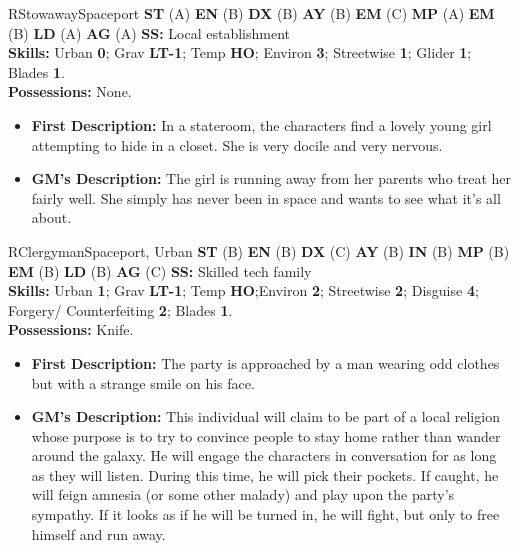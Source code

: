 \hrulefill

\begin{npc}{R}{Stowaway}{Spaceport}
\textbf{ST} (A) \textbf{EN} (B) \textbf{DX} (B) \textbf{AY} (B) \textbf{EM} (C) \textbf{MP} (A) \textbf{EM} (B) \textbf{LD} (A) \textbf{AG} (A) \textbf{SS:} Local establishment \\
\textbf{Skills:} Urban \textbf{0}; Grav \textbf{LT-1}; Temp \textbf{HO}; Environ \textbf{3}; Streetwise \textbf{1}; Glider \textbf{1}; Blades \textbf{1}. \\
\textbf{Possessions:} None. 
\begin{itemize}
\item \textbf{First Description:} In a stateroom, the characters find a lovely young girl attempting to hide in a closet. She is very docile and very 
nervous. 
\item \textbf{GM's Description:} The girl is running away from her parents who treat her fairly well. She simply has never been in space and wants 
to see what it's all about. 
\end{itemize}
\end{npc}

\hrulefill

\begin{npc}{R}{Clergyman}{Spaceport, Urban}
\textbf{ST} (B) \textbf{EN} (B) \textbf{DX} (C) \textbf{AY} (B) \textbf{IN} (B) \textbf{MP} (B) \textbf{EM} (B) \textbf{LD} (B) \textbf{AG} (C) \textbf{SS:} Skilled tech family \\
\textbf{Skills:} Urban \textbf{1}; Grav \textbf{LT-1}; Temp \textbf{HO};Environ \textbf{2}; Streetwise \textbf{2}; Disguise \textbf{4}; Forgery/ Counterfeiting \textbf{2}; Blades \textbf{1}. \\
\textbf{Possessions:} Knife. 
\begin{itemize}
\item \textbf{First Description:} The party is approached by a man wearing odd clothes but with a strange smile on his face. 
\item \textbf{GM's Description:} This individual will claim to be part of a local religion whose purpose is to try to convince people to stay home 
rather than wander around the galaxy. He will engage the characters in conversation for as long as they will listen. During this time, he 
will pick their pockets. If caught, he will feign amnesia (or some other malady) and play upon the party's sympathy. If it looks as if he 
will be turned in, he will fight, but only to free himself and run away. 
\end{itemize}
\end{npc}

